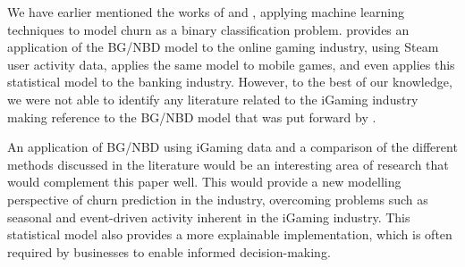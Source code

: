 We have earlier mentioned the works of \cite{borg} and \cite{mrgreen}, applying machine learning techniques to model churn as a binary classification problem. \cite{bgnbd_application_steam} provides an application of the BG/NBD model to the online gaming industry, using Steam user activity data, \cite{bgnbd_application_mobile_gaming} applies the same model to mobile games, and \cite{bgnbd_application_banking} even applies this statistical model to the banking industry. However, to the best of our knowledge, we were not able to identify any literature related to the iGaming industry making reference to the BG/NBD model that was put forward by \cite{bgnbd_hardie}. 

An application of BG/NBD using iGaming data and a comparison of the different methods discussed in the literature would be an interesting area of research that would complement this paper well. This would provide a new modelling perspective of churn prediction in the industry, overcoming problems such as seasonal and event-driven activity inherent in the iGaming industry. This statistical model also provides a more explainable implementation, which is often required by businesses to enable informed decision-making.